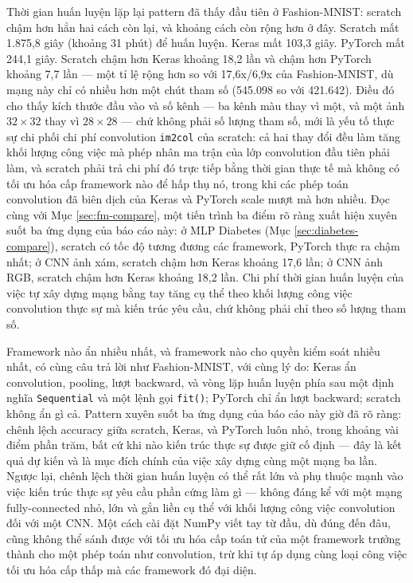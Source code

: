 \documentclass[11pt]{article}
\newcommand{\code}[1]{\texttt{#1}}
\begin{document}
Thời gian huấn luyện lặp lại pattern đã thấy đầu tiên ở Fashion-MNIST:
scratch chậm hơn hẳn hai cách còn lại, và khoảng cách còn rộng hơn ở đây.
Scratch mất 1.875,8 giây (khoảng 31 phút) để huấn luyện. Keras mất 103,3
giây. PyTorch mất 244,1 giây. Scratch chậm hơn Keras khoảng 18,2 lần và
chậm hơn PyTorch khoảng 7,7 lần — một tỉ lệ rộng hơn so với 17,6x/6,9x của
Fashion-MNIST, dù mạng này chỉ có nhiều hơn một chút tham số (545.098 so
với 421.642). Điều đó cho thấy kích thước đầu vào và số kênh — ba kênh màu
thay vì một, và một ảnh $32\times32$ thay vì $28\times28$ — chứ không phải
số lượng tham số, mới là yếu tố thực sự chi phối chi phí convolution
\code{im2col} của scratch: cả hai thay đổi đều làm tăng khối lượng công
việc mà phép nhân ma trận của lớp convolution đầu tiên phải làm, và scratch
phải trả chi phí đó trực tiếp bằng thời gian thực tế mà không có tối ưu
hóa cấp framework nào để hấp thụ nó, trong khi các phép toán convolution
đã biên dịch của Keras và PyTorch scale mượt mà hơn nhiều. Đọc cùng với
Mục \ref{sec:fm-compare}, một tiến trình ba điểm rõ ràng xuất hiện xuyên
suốt ba ứng dụng của báo cáo này: ở MLP Diabetes (Mục
\ref{sec:diabetes-compare}), scratch có tốc độ tương đương các framework,
PyTorch thực ra chậm nhất; ở CNN ảnh xám, scratch chậm hơn Keras khoảng
17,6 lần; ở CNN ảnh RGB, scratch chậm hơn Keras khoảng 18,2 lần. Chi phí
thời gian huấn luyện của việc tự xây dựng mạng bằng tay tăng cụ thể theo
khối lượng công việc convolution thực sự mà kiến trúc yêu cầu, chứ không
phải chỉ theo số lượng tham số.

Framework nào ẩn nhiều nhất, và framework nào cho quyền kiểm soát nhiều
nhất, có cùng câu trả lời như Fashion-MNIST, với cùng lý do: Keras ẩn
convolution, pooling, lượt backward, và vòng lặp huấn luyện phía sau một
định nghĩa \code{Sequential} và một lệnh gọi \code{fit()}; PyTorch chỉ ẩn
lượt backward; scratch không ẩn gì cả. Pattern xuyên suốt ba ứng dụng của
báo cáo này giờ đã rõ ràng: chênh lệch accuracy giữa scratch, Keras, và
PyTorch luôn nhỏ, trong khoảng vài điểm phần trăm, bất cứ khi nào kiến
trúc thực sự được giữ cố định — đây là kết quả dự kiến và là mục đích
chính của việc xây dựng cùng một mạng ba lần. Ngược lại, chênh lệch thời
gian huấn luyện có thể rất lớn và phụ thuộc mạnh vào việc kiến trúc thực
sự yêu cầu phần cứng làm gì — không đáng kể với một mạng fully-connected
nhỏ, lớn và gắn liền cụ thể với khối lượng công việc convolution đối với
một CNN. Một cách cài đặt NumPy viết tay từ đầu, dù đúng đến đâu, cũng
không thể sánh được với tối ưu hóa cấp toán tử của một framework trưởng
thành cho một phép toán như convolution, trừ khi tự áp dụng cùng loại công
việc tối ưu hóa cấp thấp mà các framework đó đại diện.
\end{document}
